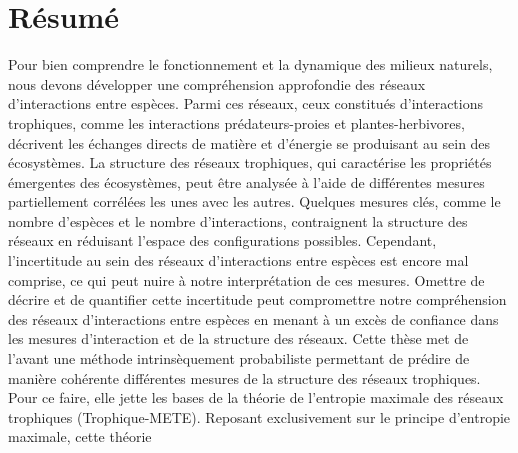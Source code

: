 \documentclass[12pt,twoside,phd]{dms}
\numberwithin{equation}{section}
\numberwithin{table}{chapter}
\numberwithin{figure}{chapter}
\begin{document}
\maketitle
\newpage
\maketitle

\doublespacing


\francais

\setlength{\parskip}{6pt} %

\chapter*{Résumé}

Pour bien comprendre le fonctionnement et la dynamique des milieux naturels,
nous devons développer une compréhension approfondie des réseaux d'interactions
entre espèces. Parmi ces réseaux, ceux constitués d'interactions trophiques,
comme les interactions prédateurs-proies et plantes-herbivores, décrivent les
échanges directs de matière et d'énergie se produisant au sein des écosystèmes.
La structure des réseaux trophiques, qui caractérise les propriétés émergentes
des écosystèmes, peut être analysée à l'aide de différentes mesures
partiellement corrélées les unes avec les autres. Quelques mesures clés, comme
le nombre d'espèces et le nombre d'interactions, contraignent la structure des
réseaux en réduisant l'espace des configurations possibles. Cependant,
l'incertitude au sein des réseaux d'interactions entre espèces est encore mal
comprise, ce qui peut nuire à notre interprétation de ces mesures. Omettre de
décrire et de quantifier cette incertitude peut compromettre notre compréhension
des réseaux d'interactions entre espèces en menant à un excès de confiance dans
les mesures d'interaction et de la structure des réseaux. Cette thèse met de
l'avant une méthode intrinsèquement probabiliste permettant de prédire de
manière cohérente différentes mesures de la structure des réseaux trophiques.
Pour ce faire, elle jette les bases de la théorie de l'entropie maximale des
réseaux trophiques (Trophique-METE). Reposant exclusivement sur le principe
d'entropie maximale, cette théorie 
\end{document}
